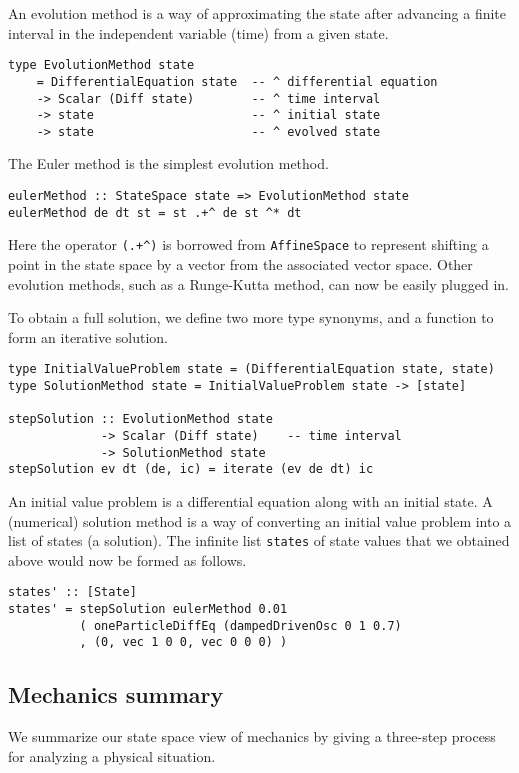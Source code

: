 \documentclass{eptcs}
\begin{document}
An evolution method is a way of approximating the state
after advancing a finite interval in the independent
variable (time) from a given state.
\begin{verbatim}
type EvolutionMethod state
    = DifferentialEquation state  -- ^ differential equation
    -> Scalar (Diff state)        -- ^ time interval
    -> state                      -- ^ initial state
    -> state                      -- ^ evolved state
\end{verbatim}
The Euler method is the simplest evolution method.
\begin{verbatim}
eulerMethod :: StateSpace state => EvolutionMethod state
eulerMethod de dt st = st .+^ de st ^* dt
\end{verbatim}
Here the operator \verb|(.+^)| is borrowed from \verb|AffineSpace|
to represent shifting a point in the state space by a vector from
the associated vector space.
Other evolution methods, such as a Runge-Kutta method, can
now be easily plugged in.

To obtain a full solution, we define two more type synonyms,
and a function to form an iterative solution.
\begin{verbatim}
type InitialValueProblem state = (DifferentialEquation state, state)
type SolutionMethod state = InitialValueProblem state -> [state]

stepSolution :: EvolutionMethod state
             -> Scalar (Diff state)    -- time interval
             -> SolutionMethod state
stepSolution ev dt (de, ic) = iterate (ev de dt) ic
\end{verbatim}
An initial value problem is a differential equation along with an initial state.
A (numerical) solution method is a way of converting
an initial value problem into a list of states (a solution).
The infinite list \verb|states| of state values that we obtained above would now be formed
as follows.
\begin{verbatim}
states' :: [State]
states' = stepSolution eulerMethod 0.01
          ( oneParticleDiffEq (dampedDrivenOsc 0 1 0.7)
          , (0, vec 1 0 0, vec 0 0 0) )
\end{verbatim}

\subsection{Mechanics summary}

We summarize our state space view of mechanics by giving a three-step
process for analyzing a physical situation.
\end{document}
